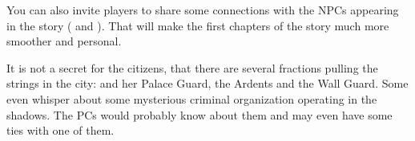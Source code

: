 You can also invite players to share some connections with the NPCs appearing in the story (\npcTroublemaker{} and \npcGrandma{}). That will make the first chapters of the story much more smoother and personal.

It is not a secret for the citizens, that there are several fractions pulling the strings in the city: \npcQueen{} and her Palace Guard, the Ardents and the Wall Guard. Some even whisper about some mysterious criminal organization operating in the shadows. The PCs would probably know about them and may even have some ties with one of them.